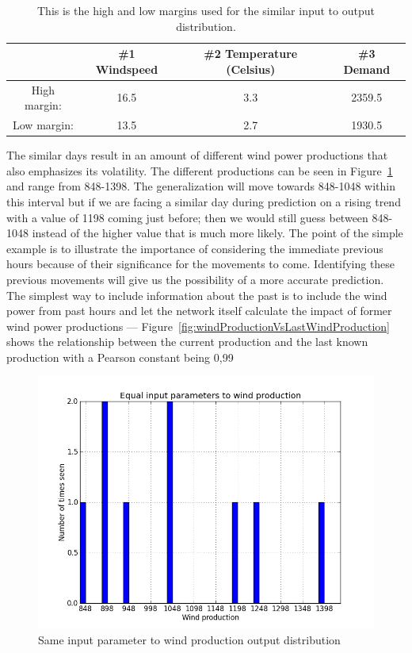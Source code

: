 \begin{table}[ht!]
\centering  %
\begin{tabular}{|c|c|c|c|} %
\hline
 & \#1 Windspeed & \#2 Temperature (Celsius) & \#3 Demand \\ \hline %
High margin: & 16.5 & 3.3 & 2359.5  \\ \hline
Low margin: & 13.5 & 2.7 & 1930.5 \\ \hline %
\hline %
\end{tabular}
\caption{This is the high and low margins used for the similar input to output distribution.} %
\label{table:similarHoursLimitsWindProd} %
\end{table}

\noindent The similar days result in an amount of different wind power productions that also emphasizes its volatility. The different productions can be seen in Figure~\ref{fig:inputParameterDistribution} and range from 848-1398. The generalization will move towards 848-1048 within this interval but if we are facing a similar day during prediction on a rising trend with a value of 1198 coming just before; then we would still guess between 848-1048 instead of the higher value that is much more likely. The point of the simple example is to illustrate the importance of considering the immediate previous hours because of their significance for the movements to come. Identifying these previous movements will give us the possibility of a more accurate prediction. The simplest way to include information about the past is to include the wind power from past hours and let the network itself calculate the impact of former wind power productions --- Figure~\ref{fig:windProductionVsLastWindProduction} shows the relationship between the current production and the last known production with a Pearson constant being 0,99   

\begin{figure}[ht!]
\centering
\includegraphics[width=0.85\linewidth]{billeder/Equal_wind.png}
\caption{Same input parameter to wind production output distribution}
\label{fig:inputParameterDistribution}
\end{figure}

